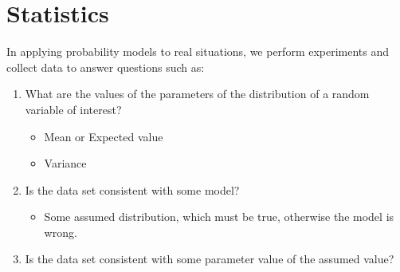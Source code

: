 \section{Statistics}\label{sec:Statistics}
In applying probability models to real situations, we perform experiments and collect data to answer questions such as:
\begin{enumerate}
\item What are the values of the parameters of the distribution of a random variable of interest?
  \begin{itemize}[noitemsep, nolistsep]
  \item Mean or Expected value
  \item Variance
  \end{itemize}

\item Is the data set consistent with some model?
  \begin{itemize}[noitemsep, nolistsep]
  \item Some assumed distribution, which must be true, otherwise the model is wrong.
  \end{itemize}

\item Is the data set consistent with some parameter value of the assumed value?
\end{enumerate}

